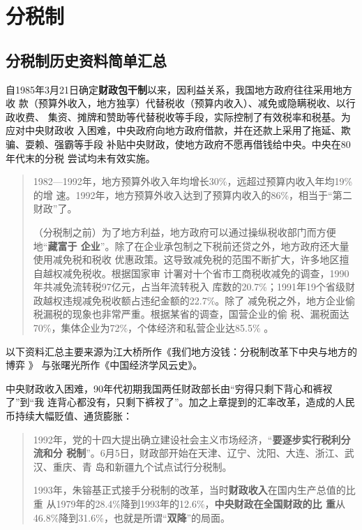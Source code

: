 
\section{分税制}


\subsection{分税制历史资料简单汇总}

自1985年3月21日确定\textbf{财政包干制}以来，因利益关系，我国地方政府往往采用地方收
款（预算外收入，地方独享）代替税收（预算内收入）、减免或隐瞒税收、以行政收费、
集资、摊牌和赞助等代替税收等手段，实际控制了有效税率和税基。为应对中央财政收
入困难，中央政府向地方政府借款，并在还款上采用了拖延、欺骗、耍赖、强霸等手段
补贴中央财政，使地方政府不愿再借钱给中央。\cite{majuncaigai}中央在80年代末的分税
尝试均未有效实施。

\begin{quotation}
  1982—1992年，地方预算外收入年均增长30\%，远超过预算内收入年均19\%的增
  速。1992年，地方预算外收入达到了预算内收入的86\%，相当于“第二财政”了。\cite{zhishenshinei}

  （分税制之前）为了地方利益，地方政府可以通过操纵税收部门而方便地“\textbf{藏富于
    企业}”。除了在企业承包制之下税前还贷之外，地方政府还大量使用减免税和税收
  优惠政策。这导致减免税的范围不断扩大，许多地区擅自越权减免税收。根据国家审
  计署对十个省市工商税收减免的调查，1990年共减免流转税97亿元，占当年流转税入
  库数的20.7\%；1991年19个省级财政越权违规减免税收额占违纪金额的22.7\%。除了
  减免税之外，地方企业偷税漏税的现象也非常严重。根据某省的调查，国营企业的偷
  税、漏税面达70\%，集体企业为72\%，个体经济和私营企业达85.5\% 。\cite{yangdi}
\end{quotation}


以下资料汇总主要来源为江大桥所作《我们地方没钱：分税制改革下中央与地方的博弈 》
\cite{difangmeiqian}与张曙光所作《中国经济学风云史》。

中央财政收入困难，90年代初期我国两任财政部长由“穷得只剩下背心和裤衩了”到“我
连背心都没有，只剩下裤衩了”。加之上章提到的汇率改革，造成的人民币持续大幅贬值、通货膨胀：

\begin{quotation}
  1992年，党的十四大提出确立建设社会主义市场经济，“\textbf{要逐步实行税利分流和分
    税制}”。6月5日，财政部开始在天津、辽宁、沈阳、大连、浙江、武汉、重庆、青
  岛和新疆九个试点试行分税制。

  1993年，朱镕基正式接手分税制的改革，当时\textbf{财政收入}在国内生产总值的比重
  从1979年的28.4\%降到1993年的12.6\%，\textbf{中央财政在全国财政的比
    重}从46.8\%降到31.6\%，也就是所谓“\textbf{双降}”的局面。
\end{quotation}

